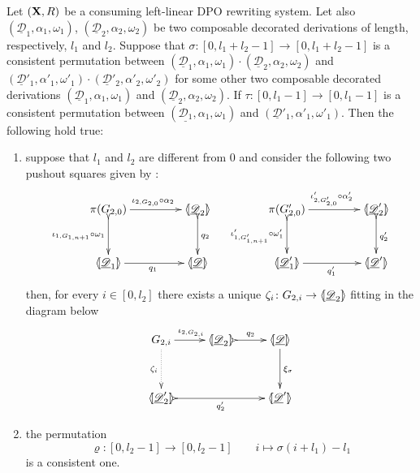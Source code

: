 \documentclass[a4paper,UKenglish,cleveref,pdftex, thm-restate,numberwithinsect,anonymous]{lipics}
\def\R{\mathsf{R}}
\def\X{\textbf {\textup{X}}}
\newcommand{\dder}[1]{\mathscr{#1}}
\newcommand{\der}[1]{\underline{\dder{#1}}}
\newcommand{\lpro}{\langle \hspace{-1.85pt}[}
\newcommand{\rpro}{]\hspace{-1.85pt}\rangle}
\newcommand{\tpro}[1]{\lpro \der{#1}\rpro}
\begin{document}
\begin{lemma}\label{lem:presuffix} Let $(\X, \R)$ be a consuming
  left-linear DPO rewriting system.  Let also
  $(\der{D}_1, \alpha_1, \omega_1)$, $(\der{D}_2, \alpha_2, \omega_2)$
  be two composable decorated derivations of length, respectively,
  $l_1$ and $l_2$. Suppose that
  $\sigma\colon [0, l_1+l_2-1]\to [0, l_1+l_2-1]$ is a consistent
  permutation between
  $(\der{D}_1, \alpha_1, \omega_1)\cdot (\der{D}_2, \alpha_2,
  \omega_2)$ and
  $(\der{D}'_1, \alpha'_1, \omega'_1)\cdot (\der{D}'_2, \alpha'_2,
  \omega'_2)$ for some other two composable decorated derivations
  $(\der{D}_1, \alpha_1, \omega_1)$ and
  $(\der{D}_2, \alpha_2, \omega_2)$.  If
  $\tau\colon [0,l_1-1]\to [0, l_1-1]$ is a consistent permutation
  between $(\der{D_1}, \alpha_1, \omega_1)$ and
  $(\der{D}'_1, \alpha'_1, \omega'_1)$. Then the following hold true:
  \begin{enumerate}
  \item suppose that $l_1$ and $l_2$ are different from $0$ and
    consider the following two pushout squares given by
    :
    \[\xymatrix@C=45pt@R=30pt{\pi(G_{2,0}) \ar@{>->}[d]_{\iota_{1,
            G_{1,n+1}} \circ \omega_1}\ar[r]^{\iota_{2, G_{2,0}} \circ
          \alpha_2}& \lpro \der{D}_2 \rpro \ar@{>->}[d]^{q_2} &
        \pi(G'_{2,0}) \ar@{>->}[d]_{\iota'_{1, G'_{1,n+1}} \circ
          \omega'_1} \ar[r]^{\iota'_{2, G'_{2,0}} \circ \alpha'_2}&
        \lpro \der{D}'_2 \rpro \ar@{>->}[d]^{q'_2} \\ \lpro \der{D}_1
        \rpro \ar[r]_{q_1} & \tpro{D} & \lpro \der{D}'_1\rpro
        \ar[r]_{q'_1} & \lpro \der{D}'\rpro }\] then, for every
    $i\in [0, l_2]$ there exists a unique
    $\zeta_i\colon G_{2,i}\to \lpro \der{D}_2\rpro $ fitting in the
    diagram below
    \[\xymatrix@R=35pt{G_{2,i} \ar[r]^{\iota_{2,G_{2,i}}} \ar@{.>}[d]_{\zeta_i}&\lpro \der{D}_2 \rpro \ar@{>->}[r]^{q_2}& \tpro{D} \ar[d]^{\xi_{\sigma}} \\
        \lpro \der{D}'_2 \rpro \ar@{>->}[rr]_{q'_2}&& \lpro
        \der{D}'\rpro }\]
  \item the permutation
    \[\varrho\colon [0,l_2-1]\to [0, l_2-1] \qquad i \mapsto
      \sigma(i+l_1)-l_1\] is a consistent one.
  \end{enumerate}
\end{lemma}
\end{document}
